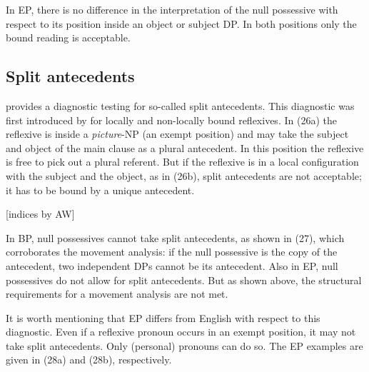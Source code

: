 \documentclass[output=paper]{langsci/langscibook}
\begin{document}
In EP, there is no difference in the interpretation of the null possessive with respect to its position inside an object or subject DP. In both positions only the bound reading is acceptable.

\subsection{Split antecedents}%

\citet{Rodrigues2010} provides a diagnostic testing for so-called split antecedents. This diagnostic was first introduced by \citet{Lebeaux1985} for locally and non-locally bound reflexives. In (26a) the reflexive is inside a \textit{picture}{}-NP (an exempt position) and may take the subject and object of the main clause as a plural antecedent. In this position the reflexive is free to pick out a plural referent. But if the reflexive is in a local configuration with the subject and the object, as in (26b), split antecedents are not acceptable; it has to be bound by a unique antecedent.

\ea%
    \citep[346]{Lebeaux1985} [indices by AW]  \label{ex:wein:26}\\
    \z
\z

In BP, null possessives cannot take split antecedents, as shown in (27), which corroborates the movement analysis: if the null possessive is the copy of the antecedent, two independent DPs cannot be its antecedent. Also in EP, null possessives do not allow for split antecedents. But as shown above, the structural requirements for a movement analysis are not met.

    \z

It is worth mentioning that EP differs from English with respect to this diagnostic. Even if a reflexive pronoun occurs in an exempt position, it may not take split antecedents. Only (personal) pronouns can do so. The EP examples are given in (28a) and (28b), respectively.
\end{document}
